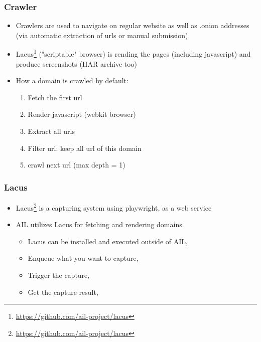 \documentclass[aspectratio=169]{beamer}
\begin{document}
\begin{frame}
        \frametitle {Crawler}
        \begin{itemize}
                \item Crawlers are used to navigate on regular website as well as .onion addresses (via automatic extraction of urls or manual submission)
                \item Lacus\footnote{\url{https://github.com/ail-project/lacus}} ("scriptable" browser) is rending the pages (including javascript) and produce screenshots (HAR archive too)
                \item How a domain is crawled by default:
		\begin{enumerate}
		    \item Fetch the first url
            \item Render javascript (webkit browser)
		    \item Extract all urls
		    \item Filter url: keep all url of this domain
		    \item crawl next url (max depth = 1)
		\end{enumerate}
        \end{itemize}
\end{frame}

\begin{frame}
    \frametitle{Lacus}
    	\begin{itemize}
            \item Lacus\footnote{\url{https://github.com/ail-project/lacus}} is a capturing system using playwright, as a web service
		    \item AIL utilizes Lacus for fetching and rendering domains.
			\begin{itemize}
				\item Lacus can be installed and executed outside of AIL,
				\item Enqueue what you want to capture,
				\item Trigger the capture,
				\item Get the capture result,
			\end{itemize}
        \end{itemize}
\end{frame}
\end{document}
